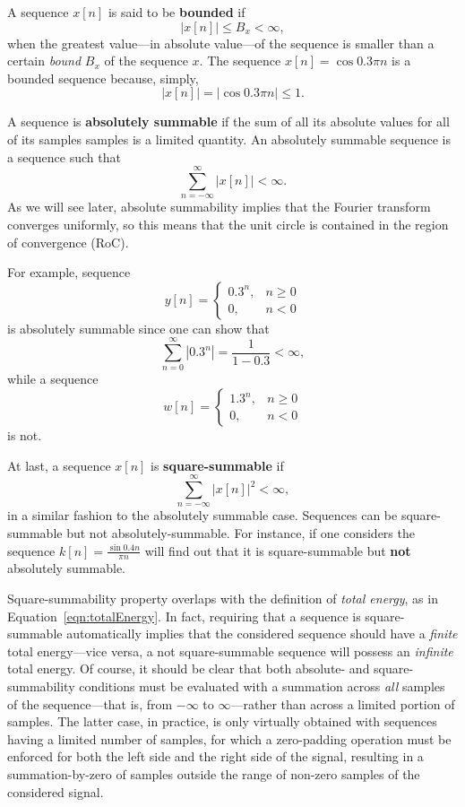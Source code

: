 \documentclass[\documentfontsize, twocolumn]{\classname}
\begin{document}
A se\-quen\-ce $x[n]$ is said to be \textbf{bounded} if \[|x[n]| \leq B_x < \infty,\] when the greatest value---in absolute value---of the se\-quen\-ce is smaller than a certain \emph{bound} $B_x$ of the se\-quen\-ce $x$. The se\-quen\-ce $x[n] = \cos{0.3\pi n}$ is a bounded se\-quen\-ce because, simply, \[|x[n]| = |\cos{0.3\pi n}| \leq 1.\]

A se\-quen\-ce is \textbf{absolutely summable} if the sum of all its absolute values for all of its samples samples is a limited quantity. An absolutely summable sequence is a sequence such that
\begin{equation}\label{eqn:absolutelySummableSequence}
    \sum_{n=-\infty}^{\infty}|x[n]| < \infty.
\end{equation}
As we will see later, absolute summability implies that the Fourier transform converges uniformly, so this means that the unit circle is contained in the region of convergence (RoC).

For example, se\-quen\-ce \[y[n] = \left\{\begin{array}{lc} 0.3^n, & n \geq 0 \\ 0, & n < 0\end{array}\right.\] is absolutely summable since one can show that \[ \sum_{n=0}^\infty |0.3^n| = \frac{1}{1 - 0.3} < \infty,\] while a sequence \[ w[n] = \left\{\begin{array}{lc} 1.3^n, & n \geq 0 \\ 0, & n < 0\end{array}\right.\] is not.

At last, a se\-quen\-ce $x[n]$ is \textbf{square-summable} if  \[\sum_{n=-\infty}^{\infty}|x[n]|^2 < \infty,\] in a similar fashion to the absolutely summable case. Se\-quen\-ces can be squa\-re-sum\-ma\-ble but not ab\-so\-lu\-te\-ly-sum\-ma\-ble. For instance, if one considers the se\-quen\-ce $k[n] = \frac{\sin{0.4n}}{\pi n}$ will find out that it is squa\-re-sum\-ma\-ble but \textbf{not} absolutely summable.

Square-summability property overlaps with the definition of \emph{total energy}, as in Equation~\ref{eqn:totalEnergy}. In fact, requiring that a sequence is square-summable automatically implies that the considered sequence should have a \emph{finite} total energy---vice versa, a not square-summable sequence will possess an \emph{infinite} total energy. Of course, it should be clear that both absolute- and square-summability conditions must be evaluated with a summation across \emph{all} samples of the sequence---that is, from $-\infty$ to $\infty$---rather than across a limited portion of samples. The latter case, in practice, is only virtually obtained with sequences having a limited number of samples, for which a zero-padding operation must be enforced for both the left side and the right side of the signal, resulting in a summation-by-zero of samples outside the range of non-zero samples of the considered signal.
\end{document}
